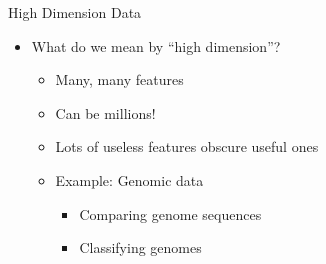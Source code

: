 \documentclass[aspectratio=169]{beamer}
\begin{document}
\begin{frame}{High Dimension Data}
\begin{itemize}
	\item What do we mean by ``high dimension''?
	\begin{itemize}
	\item Many, many features
	\item Can be millions!
	\item Lots of useless features obscure useful ones
	\item Example: Genomic data
	\begin{itemize}
	\item Comparing genome sequences
	\item Classifying genomes
	\end{itemize}
	\end{itemize}
\end{itemize}
	
\end{frame}
\end{document}
